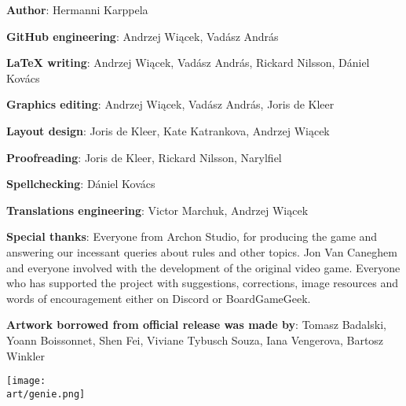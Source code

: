 
\bigbreak

\begin{multicols*}{2}

\textbf{Author}: Hermanni Karppela

\textbf{GitHub engineering}: Andrzej Wiącek, Vadász András

\textbf{LaTeX writing}: Andrzej Wiącek, Vadász András, Rickard Nilsson, Dániel Kovács

\textbf{Graphics editing}: Andrzej Wiącek, Vadász András, Joris de Kleer

\textbf{Layout design}: Joris de Kleer, Kate Katrankova, Andrzej Wiącek

\textbf{Proofreading}: Joris de Kleer, Rickard Nilsson, Narylfiel

\textbf{Spellchecking}: Dániel Kovács

\textbf{Translations engineering}: Victor Marchuk, Andrzej Wiącek

\textbf{Special thanks}: Everyone from Archon Studio, for producing the game and answering our incessant queries about rules and other topics.
Jon Van Caneghem and everyone involved with the development of the original video game.
Everyone who has supported the project with suggestions, corrections, image resources and words of encouragement either on Discord or BoardGameGeek.

\textbf{Artwork borrowed from official release was made by}: Tomasz Badalski, Yoann Boissonnet, Shen Fei, Viviane Tybusch Souza, Iana Vengerova, Bartosz Winkler

\columnbreak

\vspace*{\fill}

\texttt{[image: \\art/genie.png]}

\vspace*{\fill}

\end{multicols*}

